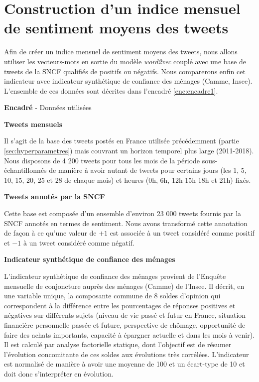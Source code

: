 \documentclass[11pt,french,french]{article}
\newcounter{comptEncadre}
\renewcommand\thecomptEncadre{%
\arabic{comptEncadre}}
\newenvironment{encadre}[2][false]{\refstepcounter{comptEncadre}
\begin{bclogo}[couleur=processblue!5,arrondi=0.1,
logo=\bcloupe,barre=none,couleurBord=blue!60!green,nobreak = #1]{ {\sc \textbf{Encadré \thecomptEncadre}} -  #2}
\smallskip
}{\end{bclogo}}
\begin{document}
\hypertarget{sec:sentimentalAnalysis}{%
\section{Construction d'un indice mensuel de sentiment moyens des tweets}\label{sec:sentimentalAnalysis}}

Afin de créer un indice mensuel de sentiment moyens des tweets, nous allons utiliser les vecteurs-mots en sortie du modèle \emph{word2vec} couplé avec une base de tweets de la SNCF qualifiés de positifs ou négatifs.
Nous comparerons enfin cet indicateur avec indicateur synthétique de confiance des ménages (Camme, Insee). L'ensemble de ces données sont décrites dans l'encadré \ref{enc:encadre1}.

\begin{encadre}[true]{Données utilisées}\label{enc:encadre1}

\small

\textbf{Tweets mensuels}

Il s'agit de la base des tweets postés en France utilisée précédemment (partie  \ref{sec:hyperparametres}) mais couvrant un horizon temporel plus large (2011-2018).
Nous disposons de 4 200 tweets pour tous les mois de la période sous-échantillonnés de manière à avoir autant de tweets pour certains jours (les 1, 5, 10, 15, 20, 25 et 28 de chaque mois) et heures (0h, 6h, 12h 15h 18h et 21h) fixés. 

\textbf{Tweets annotés par la SNCF}

Cette base est composée d'un ensemble d'environ 23 000 tweets fournis par la SNCF annotés en termes de sentiment.
Nous avons transformé cette annotation de façon à ce qu'une valeur de $+1$ est associée à un tweet considéré comme positif et $-1$ à un tweet considéré comme négatif.


\textbf{Indicateur synthétique de confiance des ménages}

L’indicateur synthétique de confiance des ménages provient de l'Enquête mensuelle de conjoncture auprès des ménages (Camme) de l’Insee.
Il décrit, en une variable unique, la composante commune de 8 soldes d’opinion qui correspondent à la différence entre les pourcentages de réponses positives et négatives sur différents sujets (niveau de vie passé et futur en France, situation financière personnelle passée et future, perspective de chômage, opportunité de faire des achats importants, capacité à épargner actuelle et dans les mois à venir).
Il est calculé par analyse factorielle statique, dont l’objectif est de résumer l’évolution concomitante de ces soldes aux évolutions très corrélées.
L’indicateur est normalisé de manière à avoir une moyenne de 100 et un écart-type de 10 et doit donc s’interpréter en évolution. 

\end{encadre}
\end{document}
